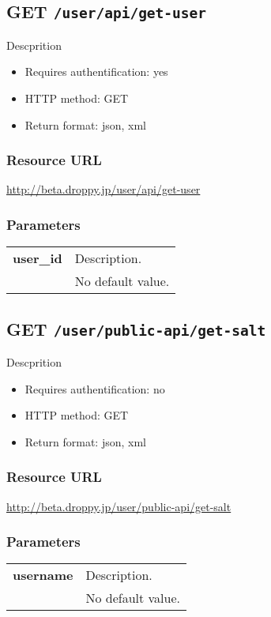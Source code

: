\documentclass[11pt,a4paper]{article}
\newcommand{\content}[1]{\begin{minipage}{10cm}\vspace{2mm}#1\vspace{2mm}\end{minipage}}
\begin{document}
      \newpage
      
      
  \subsection*{GET {\tt /user/api/get-user}}
  Descprition
  \begin{itemize}
  \item Requires authentification: yes
  \item HTTP method: GET
  \item Return format: json, xml
  \end{itemize}
  \subsubsection*{Resource URL}
  \url{http://beta.droppy.jp/user/api/get-user}
  \subsubsection*{Parameters}
  \begin{table}[h]
    \begin{center}
      \begin{tabular}{l l}
        \hline 
      \textbf{user\_id} & \content{Description. }
      \\
       & No default value.\\
      \hline
      \end{tabular}
    \end{center}
  \end{table}
  
      \newpage
      
      
  \subsection*{GET {\tt /user/public-api/get-salt}}
  Descprition
  \begin{itemize}
  \item Requires authentification: no
  \item HTTP method: GET
  \item Return format: json, xml
  \end{itemize}
  \subsubsection*{Resource URL}
  \url{http://beta.droppy.jp/user/public-api/get-salt}
  \subsubsection*{Parameters}
  \begin{table}[h]
    \begin{center}
      \begin{tabular}{l l}
        \hline 
      \textbf{username} & \content{Description. }
      \\
       & No default value.\\
      \hline
      \end{tabular}
    \end{center}
  \end{table}
  
\end{document}
